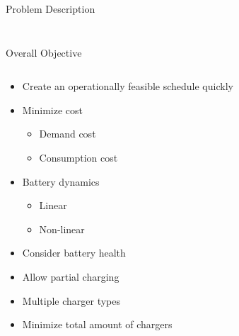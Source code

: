 \documentclass[aspectratio=169,dvipsnames]{beamer}
\begin{document}
\begin{frame}[label={sec:orgf5ce578}]{Problem Description}
\begin{columns}
\begin{column}{0.5\columnwidth}
\begin{figure}
{
      }
      \label{fig:spacial-and-temporal-constr}
\end{figure}
\end{column}
\end{columns}
\end{frame}

\begin{frame}[label={sec:org9bb4dd0}]{Overall Objective}
\begin{columns}
\begin{column}{0.5\columnwidth}
\begin{itemize}
\item Create an operationally feasible schedule quickly
\item Minimize cost
\begin{itemize}
\item Demand cost
\item Consumption cost
\end{itemize}
\item Battery dynamics
\begin{itemize}
\item Linear
\item Non-linear
\end{itemize}
\item Consider battery health
\item Allow partial charging
\item Multiple charger types
\item Minimize total amount of chargers
\end{itemize}
\end{column}

\begin{column}{0.5\columnwidth}
\begin{figure}
    \centering
\end{figure}
\end{column}
\end{columns}
\end{frame}
\end{document}
